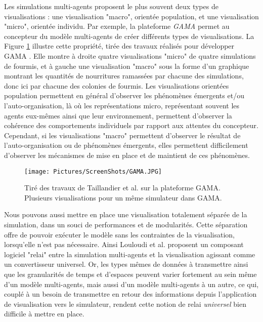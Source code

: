 		Les simulations multi-agents proposent le plus souvent deux types de visualisations : une visualisation "macro", orientée population, et une visualisation "micro", orientée individu. Par exemple, la plateforme \textit{GAMA} \cite{taillandier_building_2019} permet au concepteur du modèle multi-agents de créer différents types de visualisations. La Figure \ref{GAMA} illustre cette propriété, tirée des travaux réalisés pour développer GAMA \cite{taillandier_building_2019}. Elle montre à droite quatre visualisations "micro" de quatre simulations de fourmis, et à gauche une visualisation "macro" sous la forme d'un graphique montrant les quantités de nourritures ramassées par chacune des simulations, donc ici par chacune des colonies de fourmis.
		Les visualisations orientées population permettent en général d'observer les phénomènes émergents et/ou l'auto-organisation, là où les représentations micro, représentant souvent les agents eux-mêmes ainsi que leur environnement, permettent d'observer la cohérence des comportements individuels par rapport aux attentes du concepteur. Cependant, si les visualisations "macro" permettent d'observer le résultat de l'auto-organisation ou de phénomènes émergents, elles permettent difficilement d'observer les mécanismes de mise en place et de maintient de ces phénomènes.
		
		\begin{figure}
			\centering
			\texttt{[image: Pictures/ScreenShots/GAMA.JPG]}
			\caption{Tiré des travaux de Taillandier et al. \cite{taillandier_building_2019} sur la plateforme GAMA. Plusieurs visualisations pour un même simulateur dans GAMA.}
			\label{GAMA}
		\end{figure}
		
		Nous pouvons aussi mettre en place une visualisation totalement séparée de la simulation, dans un souci de performances et de modularités. Cette séparation offre de pouvoir exécuter le modèle sans les contraintes de la visualisation, lorsqu'elle n'est pas nécessaire. Ainsi Louloudi et al. \cite{louloudi_new_2012} proposent un composant logiciel "relai" entre la simulation multi-agents et la visualisation agissant comme un convertisseur universel.
		Or, les types mêmes de données à transmettre ainsi que les granularités de temps et d'espaces peuvent varier fortement au sein même d'un modèle multi-agents, mais aussi d'un modèle multi-agents à un autre, ce qui, couplé à un besoin de transmettre en retour des informations depuis l'application de visualisation vers le simulateur, rendent cette notion de relai \textit{universel} bien difficile à mettre en place.
		
